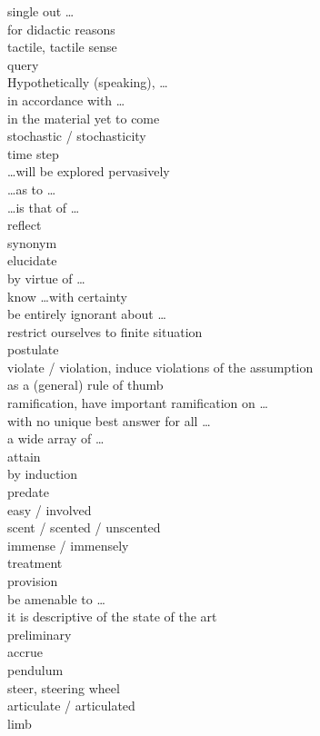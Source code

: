 \documentclass[12pt]{article}
\begin{document}
single out \dots \\
for didactic reasons \\
tactile, tactile sense \\
query \\
Hypothetically (speaking), \dots \\
in accordance with \dots \\
in the material yet to come \\
stochastic / stochasticity\\
time step \\
\dots will be explored pervasively \\
\dots as to \dots \\
\dots is that of \dots \\
reflect \\
synonym \\
elucidate \\
by virtue of \dots \\
know \dots with certainty \\
be entirely ignorant about \dots \\
restrict ourselves to finite situation \\
postulate \\
violate / violation, induce violations of the assumption \\
as a (general) rule of thumb \\
ramification, have important ramification on \dots \\
with no unique best answer for all \dots \\
a wide array of \dots \\
attain \\
by induction \\
predate \\
easy / involved \\
scent / scented / unscented \\
immense / immensely \\
treatment \\
provision \\
be amenable to \dots \\
it is descriptive of the state of the art \\
preliminary \\
accrue \\
pendulum \\
steer, steering wheel \\
articulate / articulated \\
limb \\
\end{document}
